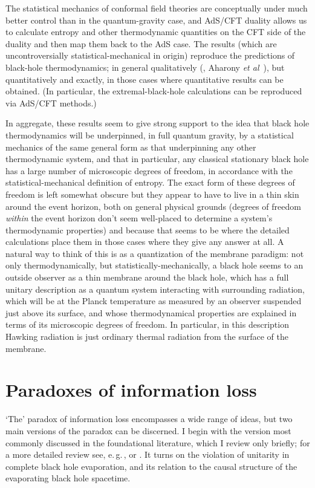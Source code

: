 \documentclass[12pt]{article}
\newcommand{\egc}{\mbox{e.\,g.\,}}
\begin{document}
The statistical mechanics of conformal field theories are conceptually under much better control than in the quantum-gravity case, and AdS/CFT duality allows us to calculate entropy and other thermodynamic quantities on the CFT side of the duality and then map them back to the AdS case. The results (which are uncontroversially statistical-mechanical in origin) reproduce the predictions of black-hole thermodynamics; in general qualitatively (, Aharony \emph{et al}~), but quantitatively and exactly, in those cases where quantitative results can be obtained. (In particular, the extremal-black-hole calculations can be reproduced \cite{stromingerconformal} via AdS/CFT methods.)

In aggregate, these results seem to give strong support to the idea that black hole thermodynamics will be underpinned, in full quantum gravity, by a statistical mechanics of the same general form as that underpinning any other thermodynamic system, and that in particular, any classical stationary black hole  has a large number of microscopic degrees of freedom, in accordance with the statistical-mechanical definition of entropy. The exact form of these degrees of freedom is left somewhat obscure but they appear to have to live in a thin skin around the event horizon, both on general physical grounds (degrees of freedom \emph{within} the event horizon don't seem well-placed to determine a system's thermodynamic properties) and because that seems to be where the detailed calculations place them in those cases where they give any answer at all. A natural way to think of this is as a quantization of the membrane paradigm: not only thermodynamically, but statistically-mechanically, a black hole seems to an outside observer as a thin membrane around the black hole, which has a full unitary description as a quantum system interacting with surrounding radiation, which will be at the Planck temperature as measured by an observer suspended just above its surface, and whose thermodynamical properties are explained in terms of its microscopic degrees of freedom. In particular, in this description Hawking radiation is just ordinary thermal radiation from the surface of the membrane. 

\section{Paradoxes of information loss}\label{paradoxes}

`The' paradox of information loss encompasses a wide range of ideas, but two main versions of the paradox can be discerned. I begin with the version most commonly discussed in the foundational literature, which I review only briefly; for a more detailed review see, \egc,  or . It turns on the violation of unitarity in complete black hole evaporation, and its relation to the causal structure of the evaporating black hole spacetime.
\end{document}
